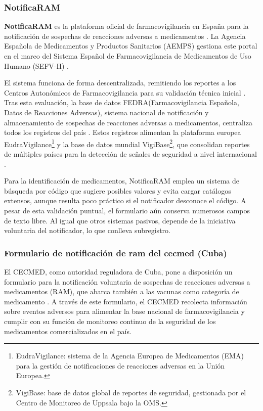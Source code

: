 \subsubsection{NotificaRAM}

\textbf{NotificaRAM} es la plataforma oficial de farmacovigilancia en España para la notificación de sospechas de reacciones adversas a medicamentos \cite{aemps_manual_2025}.
La Agencia Española de Medicamentos y Productos Sanitarios (AEMPS) gestiona este portal en el marco del Sistema Español de Farmacovigilancia de Medicamentos de Uso Humano (SEFV-H) \cite{aemps_sefv_2025}.

El sistema funciona de forma descentralizada, remitiendo los reportes a los Centros Autonómicos de Farmacovigilancia para su validación técnica inicial \cite{aemps_manual_2025}. 
Tras esta evaluación, la base de datos FEDRA(Farmacovigilancia Española, Datos de Reacciones Adversas), sistema nacional de notificación y almacenamiento de sospechas de reacciones adversas a medicamentos, centraliza todos los registros del país \cite{aemps_fedra_2026}.
Estos registros alimentan la plataforma europea EudraVigilance\footnote{EudraVigilance: sistema de la Agencia Europea de Medicamentos (EMA) para la gestión de notificaciones de reacciones adversas en la Unión Europea.} y la base de datos mundial VigiBase\footnote{VigiBase: base de datos global de reportes de seguridad, gestionada por el Centro de Monitoreo de Uppsala bajo la OMS.}, que consolidan reportes de múltiples países para la detección de señales de seguridad a nivel internacional \cite{aemps_notificacion_2026}.


Para la identificación de medicamentos, NotificaRAM emplea un sistema de búsqueda por código que sugiere posibles valores y evita cargar catálogos extensos, aunque resulta poco práctico si el notificador desconoce el código. A pesar de esta validación puntual, el formulario aún conserva numerosos campos de texto libre. Al igual que otros sistemas pasivos, depende de la iniciativa voluntaria del notificador, lo que conlleva subregistro.

\subsubsection{Formulario de notificación de \gls{ram} del \gls{cecmed} (Cuba)}

El CECMED, como autoridad reguladora de Cuba, pone a disposición un formulario para la notificación voluntaria de sospechas de reacciones adversas a medicamentos (RAM), que abarca también a las vacunas como categoría de medicamento \cite{cecmed_ram}.
A través de este formulario, el CECMED recolecta información sobre eventos adversos para alimentar la base nacional de farmacovigilancia y cumplir con su función de monitoreo continuo de la seguridad de los medicamentos comercializados en el país.

